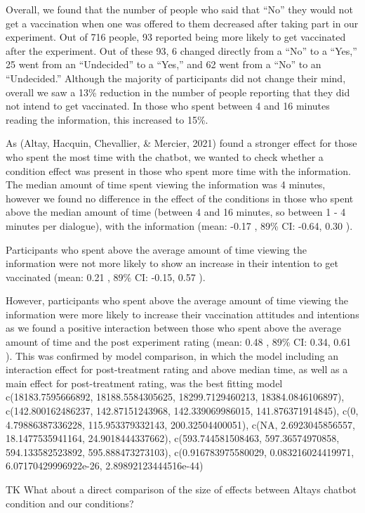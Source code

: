\documentclass[
  english,
  ,jou,floatsintext]{apa6}
\begin{document}
Overall, we found that the number of people who said that ``No'' they would not get a vaccination when one was offered to them decreased after taking part in our experiment. Out of 716 people, 93 reported being more likely to get vaccinated after the experiment. Out of these 93, 6 changed directly from a ``No'' to a ``Yes,'' 25 went from an ``Undecided'' to a ``Yes,'' and 62 went from a ``No'' to an ``Undecided.'' Although the majority of participants did not change their mind, overall we saw a 13\% reduction in the number of people reporting that they did not intend to get vaccinated. In those who spent between 4 and 16 minutes reading the information, this increased to 15\%.

As (Altay, Hacquin, Chevallier, \& Mercier, 2021) found a stronger effect for those who spent the most time with the chatbot, we wanted to check whether a condition effect was present in those who spent more time with the information. The median amount of time spent viewing the information was 4 minutes, however we found no difference in the effect of the conditions in those who spent above the median amount of time (between 4 and 16 minutes, so between 1 - 4 minutes per dialogue), with the information (mean: -0.17 , 89\% CI: -0.64, 0.30 ).

Participants who spent above the average amount of time viewing the information were not more likely to show an increase in their intention to get vaccinated (mean: 0.21 , 89\% CI: -0.15, 0.57 ).

However, participants who spent above the average amount of time viewing the information were more likely to increase their vaccination attitudes and intentions as we found a positive interaction between those who spent above the average amount of time and the post experiment rating (mean: 0.48 , 89\% CI: 0.34, 0.61 ). This was confirmed by model comparison, in which the model including an interaction effect for post-treatment rating and above median time, as well as a main effect for post-treatment rating, was the best fitting model c(18183.7595666892, 18188.5584305625, 18299.7129460213, 18384.0846106897), c(142.800162486237, 142.87151243968, 142.339069986015, 141.876371914845), c(0, 4.79886387336228, 115.953379332143, 200.32504400051), c(NA, 2.6923045856557, 18.1477535941164, 24.9018444337662), c(593.744581508463, 597.36574970858, 594.133582523892, 595.888473273103), c(0.916783975580029, 0.083216024419971, 6.07170429996922e-26, 2.89892123444516e-44)

TK What about a direct comparison of the size of effects between Altays chatbot condition and our conditions?
\end{document}

